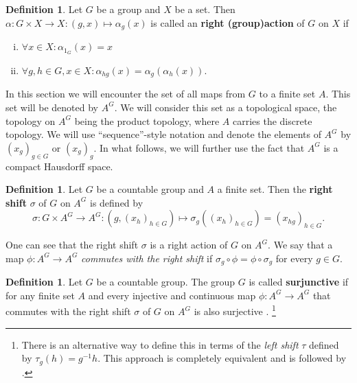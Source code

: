 \documentclass[titlepage, a4paper]{article}
\theoremstyle{theoremdd}
\theoremstyle{definition}
\newtheorem{definition}[theorem]{Definition}
\theoremstyle{remark}
\begin{document}
    \begin{definition} %
	    Let $G$ be a group and $X$ be a set. Then $\alpha: G \times X \to X: (g,x) \mapsto \alpha_g(x)$ is called an \textbf{right (group)action} of $G$ on $X$ if
        \begin{enumerate}[(i)]
		\item $\forall x \in X: \alpha_{1_G}(x) = x$
            \item $\forall g,h \in G, x\in X: \alpha_{hg}(x) = \alpha_g(\alpha_h(x))$.
        \end{enumerate}
    \end{definition}

    In this section we will encounter the set of all maps from $G$ to a finite set $A$. This set will be denoted by $A^G$. We will consider this set as a topological space, the topology on $A^G$ being the product topology, where $A$ carries the discrete topology. We will use ``sequence''-style notation and denote the elements of $A^G$ by $(x_g)_{g \in G}$ or $(x_g)_g$. In what follows, we will further use the fact that $A^G$ is a compact Hausdorff space.

    \begin{definition}
	    Let $G$ be a countable group and $A$ a finite set. Then the \textbf{right shift} $\sigma$ of $G$ on $A^G$ is defined by
        \[
        \sigma: G \times A^G \to A^G: \left(g, (x_{h})_{h \in G} \right) \mapsto \sigma_g((x_{h})_{h \in G}) = \left( x_{hg} \right)_{h \in G}.
        \]
    \end{definition}

    One can see that the right shift $\sigma$ is a right action of $G$ on $A^G$. We say that a map $\phi: A^G \to A^G$ \emph{commutes with the right shift} if $\sigma_g \circ \phi = \phi \circ \sigma_g$ for every $g \in G$.
    
    \begin{definition}
	    Let $G$ be a countable group. The group $G$ is called \textbf{surjunctive} if for any finite set $A$ and every injective and continuous map $\phi: A^{G}\to A^{G}$ that commutes with the right shift $\sigma$ of $G$ on $A^G$ is also surjective \cite[section 1]{weiss_2000} .
	    \footnote{There is an alternative way to define this in terms of the \emph{left shift} $\tau$ defined by $\tau_g(h)= g^{-1}h$. This approach is completely equivalent and is followed by \cite[paragraph 2.13.5 - 2.13.7]{capraro_lupini_2015}.}
    \end{definition}
\end{document}

